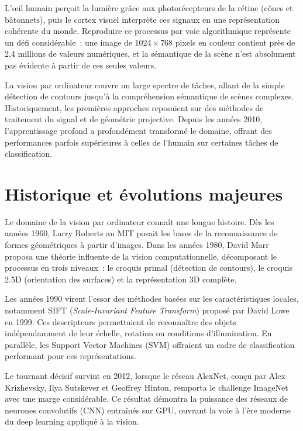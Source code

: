 \documentclass[a4paper,11pt,twoside]{book}
\begin{document}
L'œil humain perçoit la lumière grâce aux photorécepteurs de la rétine (cônes et bâtonnets), puis le cortex visuel interprète ces signaux en une représentation cohérente du monde. Reproduire ce processus par voie algorithmique représente un défi considérable~: une image de $1024 \times 768$ pixels en couleur contient près de 2,4 millions de valeurs numériques, et la sémantique de la scène n'est absolument pas évidente à partir de ces seules valeurs.

La vision par ordinateur couvre un large spectre de tâches, allant de la simple détection de contours jusqu'à la compréhension sémantique de scènes complexes. Historiquement, les premières approches reposaient sur des méthodes de traitement du signal et de géométrie projective. Depuis les années 2010, l'apprentissage profond a profondément transformé le domaine, offrant des performances parfois supérieures à celles de l'humain sur certaines tâches de classification.

\section{Historique et évolutions majeures}

Le domaine de la vision par ordinateur connaît une longue histoire. Dès les années 1960, Larry Roberts au MIT posait les bases de la reconnaissance de formes géométriques à partir d'images. Dans les années 1980, David Marr proposa une théorie influente de la vision computationnelle, décomposant le processus en trois niveaux~: le croquis primal (détection de contours), le croquis 2.5D (orientation des surfaces) et la représentation 3D complète.

Les années 1990 virent l'essor des méthodes basées sur les caractéristiques locales, notamment SIFT (\textit{Scale-Invariant Feature Transform}) proposé par David Lowe en 1999. Ces descripteurs permettaient de reconnaître des objets indépendamment de leur échelle, rotation ou conditions d'illumination. En parallèle, les Support Vector Machines (SVM) offraient un cadre de classification performant pour ces représentations.

Le tournant décisif survint en 2012, lorsque le réseau AlexNet, conçu par Alex Krizhevsky, Ilya Sutskever et Geoffrey Hinton, remporta le challenge ImageNet avec une marge considérable. Ce résultat démontra la puissance des réseaux de neurones convolutifs (CNN) entraînés sur GPU, ouvrant la voie à l'ère moderne du deep learning appliqué à la vision.
\end{document}
